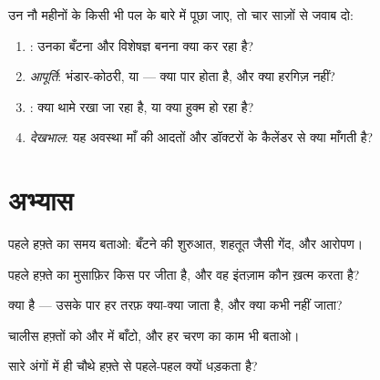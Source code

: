 \begin{method}\label{met:g8:from-egg-to-birth:explain}
उन नौ महीनों के किसी भी पल के बारे में पूछा जाए, तो चार साज़ों से जवाब
दो:
\begin{enumerate}
  \item \emph{}: उनका बँटना और विशेषज्ञ बनना क्या कर रहा है?
  \item \emph{आपूर्ति}: भंडार-कोठरी, या  --- क्या पार होता है, और
        क्या हरगिज़ नहीं?
  \item \emph{}: क्या थामे रखा जा रहा है, या क्या हुक्म हो रहा
        है?
  \item \emph{देखभाल}: यह अवस्था माँ की आदतों और डॉक्टरों के कैलेंडर
        से क्या माँगती है?
\end{enumerate}
\end{method}

\section{अभ्यास}

\begin{exercise}[$\star$]\label{exo:g8:from-egg-to-birth:1}
पहले हफ़्ते का समय बताओ: बँटने की शुरुआत, शहतूत जैसी गेंद, और आरोपण।
\end{exercise}

\begin{exercise}[$\star$]\label{exo:g8:from-egg-to-birth:2}
पहले हफ़्ते का मुसाफ़िर किस पर जीता है, और वह इंतज़ाम कौन ख़त्म करता
है?
\end{exercise}

\begin{exercise}[$\star$]\label{exo:g8:from-egg-to-birth:3}
 क्या है --- उसके पार हर तरफ़ क्या-क्या जाता है, और क्या कभी नहीं
जाता?
\end{exercise}

\begin{exercise}[$\star$]\label{exo:g8:from-egg-to-birth:4}
चालीस हफ़्तों को  और  में बाँटो, और हर चरण का काम भी
बताओ।
\end{exercise}

\begin{exercise}[$\star$]\label{exo:g8:from-egg-to-birth:5}
सारे अंगों में  ही चौथे हफ़्ते से पहले-पहल क्यों धड़कता है?
\end{exercise}

